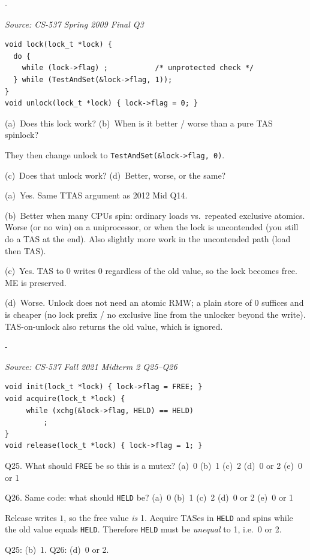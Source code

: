 \documentclass[11pt,a4paper]{article}
\makeatletter
\newcommand{\keepspace}[1]{\par\penalty-100\begingroup
  \setlength{\dimen@}{#1}\dimen@ii\pagegoal\advance\dimen@ii-\pagetotal
  \ifdim\dimen@>\dimen@ii\ifdim\dimen@ii>\z@\vfil\fi\break\fi\endgroup}
\newcounter{qn}[section]
\newenvironment{Qn}[4]{%
  \refstepcounter{qn}\keepspace{7\baselineskip}%
  \begin{tcolorbox}[qboxstyle, title={Q\thesection.\theqn\ \ [#1 \textbar\ #2]\ \ #4}]%
  {\footnotesize\color{g3}\textit{Source: #3}}\par\smallskip%
}{%
  \end{tcolorbox}%
}
\newenvironment{Sol}{%
  \begin{tcolorbox}[sboxstyle, title={Solution}]%
}{%
  \end{tcolorbox}\vspace{0.35em}%
}
\makeatother
\begin{document}
\begin{Qn}{Medium-Hard}{Lect 17}{CS-537 Spring 2009 Final Q3}{TTAS lock, and unlocking with TAS}
\begin{lstlisting}[numbers=none]
void lock(lock_t *lock) {
  do {
    while (lock->flag) ;           /* unprotected check */
  } while (TestAndSet(&lock->flag, 1));
}
void unlock(lock_t *lock) { lock->flag = 0; }
\end{lstlisting}

(a)~Does this lock work? (b)~When is it better / worse than a pure TAS spinlock?

They then change unlock to \texttt{TestAndSet(\&lock->flag, 0)}.

(c)~Does that unlock work? (d)~Better, worse, or the same?
\end{Qn}
\begin{Sol}
(a)~Yes. Same TTAS argument as 2012 Mid Q14.

(b)~Better when many CPUs spin: ordinary loads vs.\ repeated exclusive atomics. Worse (or no win) on a uniprocessor, or when the lock is uncontended (you still do a TAS at the end). Also slightly more work in the uncontended path (load then TAS).

(c)~Yes. TAS to 0 writes 0 regardless of the old value, so the lock becomes free. ME is preserved.

(d)~Worse. Unlock does not need an atomic RMW; a plain store of 0 suffices and is cheaper (no lock prefix / no exclusive line from the unlocker beyond the write). TAS-on-unlock also returns the old value, which is ignored.
\end{Sol}

\begin{Qn}{Medium-Hard}{Lect 17}{CS-537 Fall 2021 Midterm 2 Q25--Q26}{\texttt{FREE} and \texttt{HELD} polarity}
\begin{lstlisting}[numbers=none]
void init(lock_t *lock) { lock->flag = FREE; }
void acquire(lock_t *lock) {
     while (xchg(&lock->flag, HELD) == HELD)
         ;
}
void release(lock_t *lock) { lock->flag = 1; }
\end{lstlisting}

Q25. What should \texttt{FREE} be so this is a mutex? (a)~0 (b)~1 (c)~2 (d)~0 or 2 (e)~0 or 1

Q26. Same code: what should \texttt{HELD} be? (a)~0 (b)~1 (c)~2 (d)~0 or 2 (e)~0 or 1
\end{Qn}
\begin{Sol}
Release writes $1$, so the free value \emph{is} 1. Acquire TASes in \texttt{HELD} and spins while the old value equals \texttt{HELD}. Therefore \texttt{HELD} must be \emph{unequal} to 1, i.e.\ 0 or 2.

Q25: (b)~1. \quad Q26: (d)~0 or 2.
\end{Sol}
\end{document}
